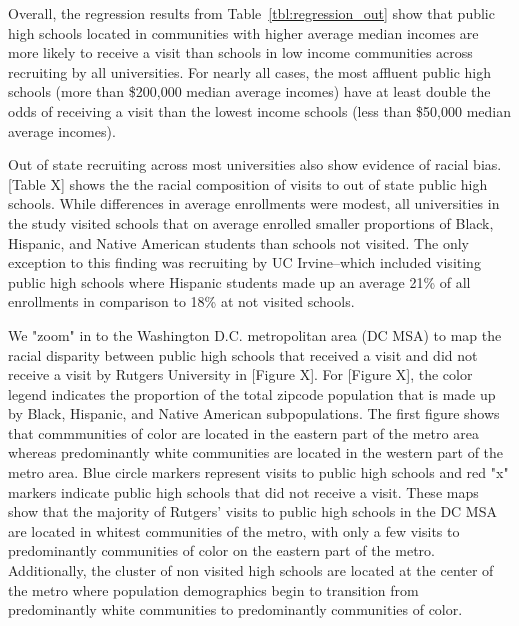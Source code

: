 \documentclass[twoside]{article}
\begin{document}
Overall, the regression results from Table~\ref{tbl:regression_out} show that public high schools located in communities with higher average median incomes are more likely to receive a visit than schools in low income communities across recruiting by all universities. For nearly all cases, the most affluent public high schools (more than \$200,000 median average incomes) have at least double the odds of receiving a visit than the lowest income schools (less than \$50,000 median average incomes). 

Out of state recruiting across most universities also show evidence of racial bias. [Table X] shows the the racial composition of visits to out of state public high schools. While differences in average enrollments were modest, all universities in the study visited schools that on average enrolled smaller proportions of Black, Hispanic, and Native American students than schools not visited. The only exception to this finding was recruiting by UC Irvine--which included visiting public high schools where Hispanic students made up an average 21\% of all enrollments in comparison to 18\% at not visited schools. 

We "zoom" in to the Washington D.C. metropolitan area (DC MSA) to map the racial disparity between public high schools that received a visit and did not receive a visit by Rutgers University in [Figure X]. For [Figure X], the color legend indicates the proportion of the total zipcode population that is made up by Black, Hispanic, and Native American subpopulations. The first figure shows that commmunities of color are located in the eastern part of the metro area whereas predominantly white communities are located in the western part of the metro area. Blue circle markers represent visits to public high schools and red "x" markers indicate public high schools that did not receive a visit. These maps show that the majority of Rutgers' visits to public high schools in the DC MSA are located in whitest communities of the metro, with only a few visits to predominantly communities of color on the eastern part of the metro. Additionally, the cluster of non visited high schools are located at the center of the metro where population demographics begin to transition from predominantly white communities to predominantly communities of color. 
\end{document}
